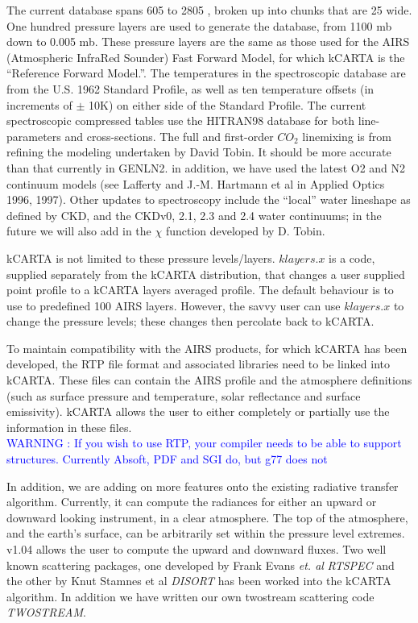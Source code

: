 \documentclass[12pt]{article}
\newcommand{\kc}{\textsf{kCARTA}\xspace}
\begin{document}
The current database spans 605 \wn to 2805 \wn, broken up into chunks
that are 25 \wn wide.  One hundred pressure layers are used to generate the 
database, from 1100 mb down to 0.005 mb.  These pressure layers are the same 
as those used for the AIRS (Atmospheric InfraRed Sounder) Fast Forward Model, 
for which \kc is the ``Reference Forward Model.''.  The temperatures in the
spectroscopic database are from the U.S. 1962 Standard Profile, as
well as ten temperature offsets (in increments of $\pm$ 10K) on either
side of the Standard Profile.  The current spectroscopic compressed
tables use the {\sf HITRAN98} database for both line-parameters and
cross-sections.  The full and first-order $CO_{2}$ linemixing is from 
refining the modeling undertaken by David Tobin. It should be more accurate 
than that currently in {\sf GENLN2}. in addition, we have used the latest
O2 and N2 continuum models (see Lafferty and J.-M. Hartmann et al in Applied 
Optics 1996, 1997). Other updates to spectroscopy include the ``local'' 
water lineshape as defined by CKD, and the CKDv0, 2.1, 2.3 and 2.4 water 
continuums; in the future we will also add in the $\chi$ function developed 
by D. Tobin. 

\kc is not limited to these pressure levels/layers. $klayers.x$ is a code, 
supplied separately from the \kc distribution, that changes a user supplied 
point profile to a kCARTA layers averaged profile. The default behaviour is 
to use to 
predefined 100 AIRS layers. However, the savvy user can use $klayers.x$ to 
change the pressure levels; these changes then percolate back to \kc.

To maintain compatibility with the AIRS products, for which \kc has been 
developed, the RTP file format and associated libraries need to be linked into
\kc. These files can contain the AIRS profile and the atmosphere definitions 
(such as surface pressure and
temperature, solar reflectance and surface emissivity). \kc allows the user 
to either completely or partially use the information in these files.\\
\textcolor{blue}
{WARNING : If you wish to use RTP, your compiler needs to be able to support 
structures. Currently Absoft, PDF and SGI do, but g77 does not}

In addition, we are adding on more features onto the existing radiative 
transfer algorithm. Currently, it can compute the radiances for either
an upward or downward looking instrument, in a clear atmosphere. The top of 
the atmosphere, and the earth's surface, can be arbitrarily set within the 
pressure level extremes. v1.04 allows the user to compute the upward and 
downward fluxes. Two well known scattering packages, one developed by Frank 
Evans {\em et. al} {\em RTSPEC} and the other by Knut Stamnes et al 
{\em DISORT} has been worked into the kCARTA algorithm. In addition we have 
written our own twostream scattering code {\em TWOSTREAM}. 
\end{document}
